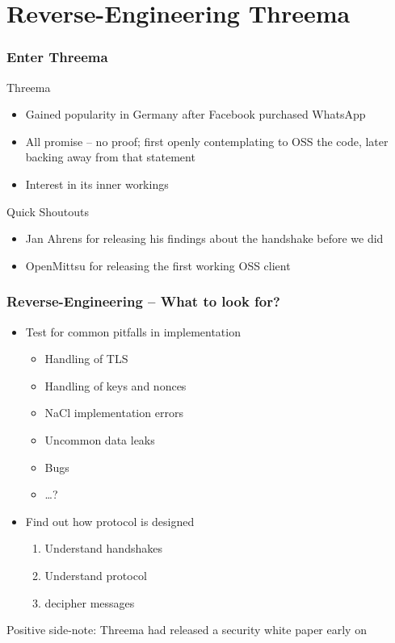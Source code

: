 \documentclass[aspectratio=169]{beamer}
\begin{document}
\section{Reverse-Engineering Threema}

\begin{frame}
	\frametitle{Enter Threema}
	Threema
	\begin{itemize}
		\item Gained popularity in Germany after Facebook purchased WhatsApp
		\item All promise -- no proof; first openly contemplating to OSS the code, later backing away from that statement
		\item Interest in its inner workings
	\end{itemize}

	Quick Shoutouts
	\begin{itemize}
		\item Jan Ahrens for releasing his findings about the handshake before we did
		\item OpenMittsu for releasing the first working OSS client
	\end{itemize}
	
\end{frame}

\begin{frame}
	\frametitle{Reverse-Engineering -- What to look for?}
\begin{itemize}
	\item Test for common pitfalls in implementation
		\begin{itemize}
			\item Handling of TLS
			\item Handling of keys and nonces
			\item NaCl implementation errors
			\item Uncommon data leaks
			\item Bugs
			\item \ldots?
		\end{itemize}
	\item Find out how protocol is designed
		\begin{enumerate}
			\item Understand handshakes
			\item Understand protocol
			\item decipher messages
		\end{enumerate}
\end{itemize}
\alert{Positive side-note}: Threema had released a security white paper early on
\end{frame}
\end{document}
